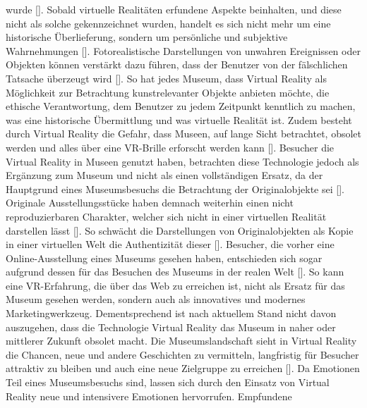 \documentclass[a4paper,12pt,oneside]{article}
\begin{document}
        wurde [\cite[38]{Heidsiek2019}]. Sobald virtuelle Realitäten erfundene Aspekte 
        beinhalten, und diese nicht als solche gekennzeichnet wurden, handelt es sich nicht
        mehr um eine historische Überlieferung, sondern um persönliche und subjektive 
        Wahrnehmungen [\cite[38]{Heidsiek2019}]. Fotorealistische Darstellungen
        von unwahren Ereignissen oder Objekten können verstärkt dazu führen, dass der
        Benutzer von der fälschlichen Tatsache überzeugt wird [\cite[39]{Heidsiek2019}].
        So hat jedes Museum, dass Virtual Reality als Möglichkeit zur Betrachtung 
        kunstrelevanter Objekte anbieten möchte, die ethische Verantwortung, 
        dem Benutzer zu jedem Zeitpunkt kenntlich zu machen,
        was eine historische Übermittlung und was virtuelle Realität ist.
        Zudem besteht durch Virtual Reality die Gefahr, dass Museen, auf lange Sicht 
        betrachtet, obsolet werden und alles über eine VR-Brille erforscht werden kann
        [\cite[142-143]{Huennekens2002}]. Besucher die Virtual Reality in Museen genutzt
        haben, betrachten diese Technologie jedoch als Ergänzung zum Museum und nicht als
        einen vollständigen Ersatz, da der Hauptgrund eines Museumsbesuchs die Betrachtung
        der Originalobjekte sei [\cite[79]{Heidsiek2019}]. Originale Ausstellungsstücke
        haben demnach weiterhin einen nicht reproduzierbaren Charakter, welcher sich nicht 
        in einer
        virtuellen Realität darstellen lässt [\cite[93]{Heidsiek2019}]. So schwächt die
        Darstellungen von Originalobjekten als Kopie in einer virtuellen Welt
        die Authentizität dieser [\cite[93]{Heidsiek2019}]. 
        Besucher, die vorher eine Online-Ausstellung eines Museums gesehen haben,
        entschieden sich sogar aufgrund dessen für das Besuchen des Museums in der 
        realen Welt [\cite[777-778]{Katz2015}]. So kann eine VR-Erfahrung, die über
        das Web zu erreichen ist, nicht als Ersatz für das Museum gesehen werden,
        sondern auch als innovatives und modernes Marketingwerkzeug.
        Dementsprechend ist nach aktuellem
        Stand nicht davon auszugehen, dass die Technologie Virtual Reality das Museum in
        naher oder mittlerer Zukunft obsolet macht.
        Die Museumslandschaft sieht in Virtual Reality die Chancen, neue und andere
        Geschichten zu vermitteln, langfristig für Besucher attraktiv zu bleiben und
        auch eine neue Zielgruppe zu erreichen [\cite[34-35]{Heidsiek2019}].
        Da Emotionen Teil eines Museumsbesuchs sind, lassen sich durch den Einsatz
        von Virtual Reality neue und intensivere Emotionen hervorrufen. Empfundene
\end{document}
